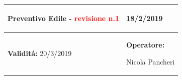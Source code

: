 \documentclass[a4paper]{article}
\begin{document}
                                  \begin{center}
                                  \begin{tabular}{|L{89mm} R{60mm}| }
                                  \hline
                                  \vspace{2.5mm}
                                  \begin{spacing}{0}
                                \textbf{Preventivo Edile - } \textcolor{red}{revisione n.1}
                                  \end{spacing}&
                                  \vspace{2.5mm}
                                  \begin{spacing}{0}

                                18/2/2019

                                  \end{spacing}\\
                                  \hline
                                  \vspace{2.5mm}
                                  \begin{spacing}{0}

                                
                                        \textbf{Validit\'a:}
                                   20/3/2019
                                  \end{spacing} &
                                  \vspace{2.5mm}
                                  \begin{spacing}{0}
                                    \textbf{Operatore:}

                               Nicola Pancheri
                                  \end{spacing} \\
                                  \hline
                                  \end{tabular}
                                  \end{center}
                               
\end{document}
